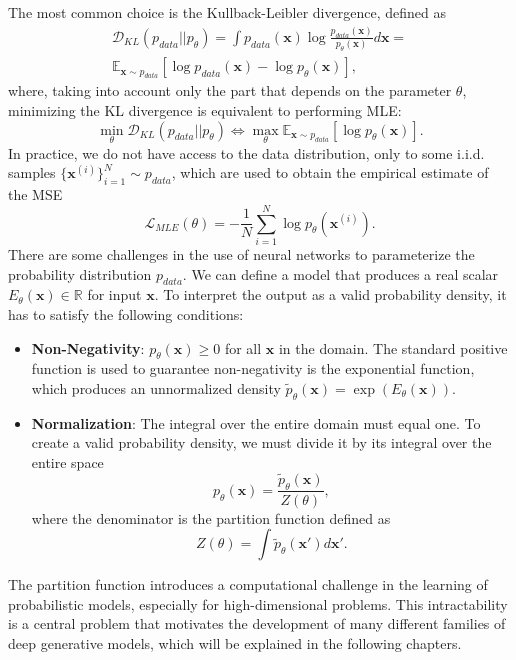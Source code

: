 The most common choice is the Kullback-Leibler divergence, defined as 
\begin{equation}
\begin{split}
    \mathcal{D}_{KL}(p_{data}||p_{\theta}) = \int p_{data}(\mathbf{x})\log \frac{p_{data}(\mathbf{x})}{p_{\theta}(\mathbf{x})}d\mathbf{x} = \\ 
    \mathbb{E}_{\mathbf{x}\sim p_{data}}\left[\log p_{data}(\mathbf{x}) - \log p_{\theta}(\mathbf{x})\right],
\end{split}
\end{equation}
where, taking into account only the part that depends 
on the parameter $\theta$, minimizing the KL divergence is equivalent to performing MLE: $$\min_{\theta}\mathcal{D}_{KL}(p_{data}||p_{\theta}) \Longleftrightarrow 
\max_{\theta}\mathbb{E}_{\mathbf{x}\sim p_{data}}\left[\log p_{\theta}(\mathbf{x})\right].$$ In practice, we do not have access to the data distribution, only to 
some i.i.d. samples $\{\mathbf{x}^{(i)}\}_{i=1}^N\sim p_{data}$, which are used to obtain the empirical estimate of the MSE $$\mathcal{L}_{MLE}(\theta) = 
-\frac{1}{N}\sum_{i=1}^N\log p_{\theta}(\mathbf{x}^{(i)}).$$   
There are some challenges in the use of neural networks to parameterize the probability distribution $p_{data}$. We can define a model that produces a real scalar 
$E_{\theta}(\mathbf{x})\in\mathbb{R}$ for input $\mathbf{x}$. To interpret the output as a valid probability density, it has to satisfy the following conditions: 
\begin{itemize}
    \item \textbf{Non-Negativity}: $p_{\theta}(\mathbf{x})\geq 0$ for all $\mathbf{x}$ in the domain. The standard positive function is used to guarantee non-negativity 
    is the exponential function, which produces an unnormalized density $\tilde p_{\theta}(\mathbf{x}) = \exp(E_{\theta}(\mathbf{x}))$.
    \item \textbf{Normalization}: The integral over the entire domain must equal one. To create a valid probability density, we must divide it by its integral over 
    the entire space $$p_{\theta}(\mathbf{x})=\frac{\tilde p_{\theta}(\mathbf{x})}{Z(\theta)},$$ where the denominator is the partition function defined as 
    $$Z(\theta)=\int \tilde p_{\theta}(\mathbf{x'})d\mathbf{x'}.$$ 
\end{itemize}
The partition function introduces a computational challenge in the learning of probabilistic models, especially for high-dimensional problems. This intractability is 
a central problem that motivates the development of many different families of deep generative models, which will be explained in the following chapters. 


